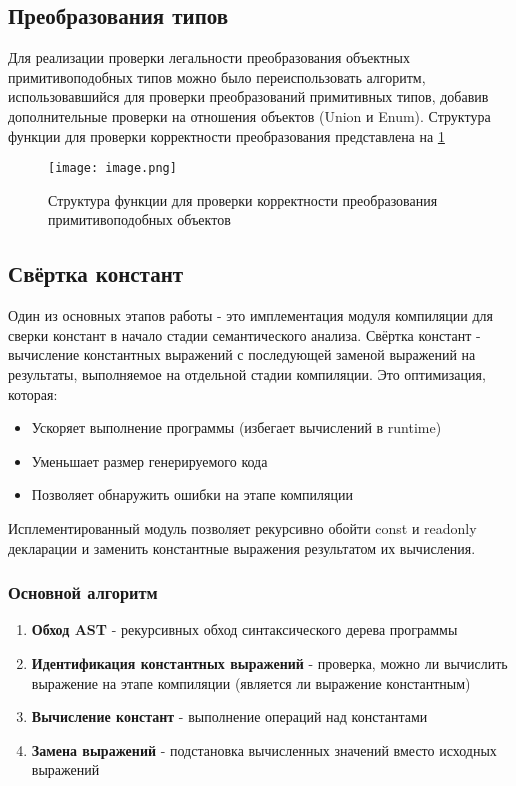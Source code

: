 \subsection{Преобразования типов}
Для реализации проверки легальности преобразования объектных примитивоподобных типов можно было переиспользовать алгоритм, использовавшийся для проверки преобразований примитивных типов, добавив дополнительные проверки на отношения объектов (Union и Enum).
Структура функции для проверки корректности преобразования представлена на \ref{fig:cmp}
\begin{figure}[H]
    \centering
    \texttt{[image: image.png]}
    \caption{Структура функции для проверки корректности преобразования примитивоподобных объектов}
    \label{fig:cmp}
\end{figure}

\subsection{Свёртка констант}
Один из основных этапов работы - это имплементация модуля компиляции для сверки констант в начало стадии семантического анализа.
Свёртка констант - вычисление константных выражений с последующей заменой выражений на результаты,
выполняемое на отдельной стадии компиляции. Это оптимизация, которая:
\begin{itemize}[label={--}]
    \item Ускоряет выполнение программы (избегает вычислений в runtime)
    \item Уменьшает размер генерируемого кода
    \item Позволяет обнаружить ошибки на этапе компиляции
\end{itemize}

Исплементированный модуль позволяет рекурсивно обойти const и readonly декларации и заменить константные выражения результатом их вычисления.
\subsubsection{Основной алгоритм}
\begin{enumerate}[label={--}]
    \item \textbf{Обход AST} - рекурсивных обход синтаксического дерева программы
    \item \textbf{Идентификация константных выражений} - проверка, можно ли вычислить выражение на этапе компиляции (является ли выражение константным)
    \item \textbf{Вычисление констант} - выполнение операций над константами
    \item \textbf{Замена выражений} - подстановка вычисленных значений вместо исходных выражений
\end{enumerate}

